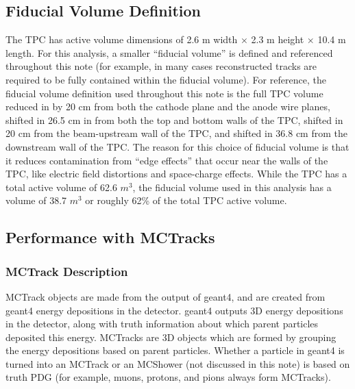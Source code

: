 \subsection{Fiducial Volume Definition}\label{fidvol_section}
The {\ub} TPC has active volume dimensions of 2.6 m width $\times$ 2.3 m height $\times$ 10.4 m length. For this analysis, a smaller ``fiducial volume'' is defined and referenced throughout this note (for example, in many cases reconstructed tracks are required to be fully contained within the fiducial volume). For reference, the fiducial volume definition used throughout this note is the full TPC volume reduced in by 20 cm from both the cathode plane and the anode wire planes, shifted in 26.5 cm in from both the top and bottom walls of the TPC, shifted in 20 cm from the beam-upstream wall of the TPC, and shifted in 36.8 cm from the downstream wall of the TPC. The reason for this choice of fiducial volume is that it reduces contamination from ``edge effects'' that occur near the walls of the TPC, like electric field distortions and space-charge effects. While the TPC has a total active volume of 62.6 $m^3$, the fiducial volume used in this analysis has a volume of 38.7 $m^3$ or roughly 62\% of the total TPC active volume.









\subsection{Performance with {\sc MCTracks}}\label{MCBNBMCTrack_performance_section}


\subsubsection{MCTrack Description}\label{MCTrack_section}
{\sc MCTrack} objects are made from the output of {\sc geant}4, and are created from {\sc geant}4 energy depositions in the detector. {\sc geant}4 outputs 3D energy depositions in the detector, along with truth information about which parent particles deposited this energy. {\sc MCTracks} are 3D objects which are formed by grouping the energy depositions based on parent particles. Whether a particle in {\sc geant}4 is turned into an {\sc MCTrack} or an {\sc MCShower} (not discussed in this note) is based on truth PDG (for example, muons, protons, and pions always form {\sc MCTracks}).\\

